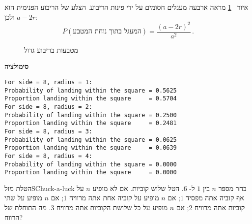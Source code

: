 איור%
~\ref{f.coins2}
מראה ארבעה מעגלים חסומים על ידי פינות הריבוע. הצלע של הריבוע הפנימית הוא 
$a-2r$
ולכן:
\[
P(\textrm{המעגל בתוך נוחת המטבע})=\frac{(a-2r)^2}{a^2}\,.
\]
\begin{figure}[tb]
\begin{center}
\end{center}
\caption{מטבעות בריבוע גדול}\label{f.coins2}
\end{figure}

\textbf{סימולציה}
\begin{verbatim}
For side = 8, radius = 1:
Probability of landing within the square = 0.5625
Proportion landing within the square     = 0.5704
For side = 8, radius = 2:
Probability of landing within the square = 0.2500
Proportion landing within the square     = 0.2481
For side = 8, radius = 3:
Probability of landing within the square = 0.0625
Proportion landing within the square     = 0.0639
For side = 8, radius = 4:
Probability of landing within the square = 0.0000
Proportion landing within the square     = 0.0000
\end{verbatim}


\begin{prob}{הטלת מזל}{S}{Chuck-a-luck}
בחר מספר 
$n$
בין 
$1$
ל-%
$6$.
הטל שלוש קוביות. אם לא מופיע
$n$
על אף קוביה אתה מפסיד
$1$;
אם 
$n$
מופיע על קוביה אחת אתה מרוויח
$1$;
אם 
$n$
מופיע על שתי קוביות אתה מרוויח
$2$;
אם 
$n$
מופיע על כל שלושת הקוביות אתה מרוויח 
$3$.
מה התוחלת של הרווח?
\end{prob}

